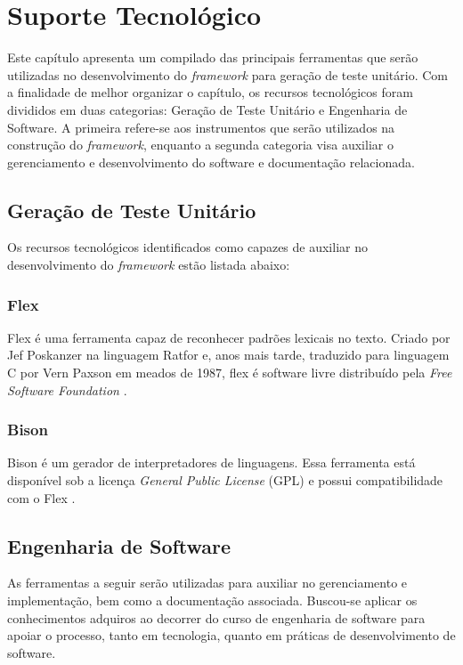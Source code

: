 \chapter[Suporte Tecnológico]{Suporte Tecnológico}

Este capítulo apresenta um compilado das principais ferramentas que serão utilizadas no desenvolvimento do \textit{framework} para geração de teste unitário. Com a finalidade de melhor organizar o capítulo, os recursos tecnológicos foram divididos em duas categorias: Geração de Teste Unitário e Engenharia de Software. A primeira refere-se aos instrumentos que serão utilizados na construção do \textit{framework}, enquanto a segunda categoria visa auxiliar o gerenciamento e desenvolvimento do software e documentação relacionada.

\section{Geração de Teste Unitário}

Os recursos tecnológicos identificados como capazes de auxiliar no desenvolvimento do \textit{framework} estão listada abaixo:

\subsection{Flex}
Flex é uma ferramenta capaz de reconhecer padrões lexicais no texto. Criado por Jef Poskanzer na linguagem Ratfor e, anos mais tarde, traduzido para linguagem C por Vern Paxson em meados de 1987, flex é software livre distribuído pela \textit{Free Software Foundation} \cite{flex}. 

\subsection{Bison}
Bison é um gerador de interpretadores de linguagens. Essa ferramenta está disponível sob a licença \textit{General Public License} (GPL) e possui compatibilidade com o Flex \cite{bison}. 

\section{Engenharia de Software}

As ferramentas a seguir serão utilizadas para auxiliar no gerenciamento e implementação, bem como a documentação associada. Buscou-se aplicar os conhecimentos adquiros ao decorrer do curso de engenharia de software para apoiar o processo, tanto em tecnologia, quanto em práticas de desenvolvimento de software.

